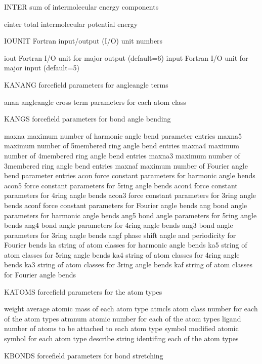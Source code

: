 \documentclass[letterpaper,11pt,english]{sphinxmanual}
\begin{document}
INTER   sum of intermolecular energy components

einter  total intermolecular potential energy

IOUNIT  Fortran input/output (I/O) unit numbers

iout    Fortran I/O unit for major output (default=6)
input   Fortran I/O unit for major input (default=5)

KANANG  forcefield parameters for angle\sphinxhyphen{}angle terms

anan    angle\sphinxhyphen{}angle cross term parameters for each atom class

KANGS   forcefield parameters for bond angle bending

maxna   maximum number of harmonic angle bend parameter entries
maxna5  maximum number of 5\sphinxhyphen{}membered ring angle bend entries
maxna4  maximum number of 4\sphinxhyphen{}membered ring angle bend entries
maxna3  maximum number of 3\sphinxhyphen{}membered ring angle bend entries
maxnaf  maximum number of Fourier angle bend parameter entries
acon    force constant parameters for harmonic angle bends
acon5   force constant parameters for 5\sphinxhyphen{}ring angle bends
acon4   force constant parameters for 4\sphinxhyphen{}ring angle bends
acon3   force constant parameters for 3\sphinxhyphen{}ring angle bends
aconf   force constant parameters for Fourier angle bends
ang     bond angle parameters for harmonic angle bends
ang5    bond angle parameters for 5\sphinxhyphen{}ring angle bends
ang4    bond angle parameters for 4\sphinxhyphen{}ring angle bends
ang3    bond angle parameters for 3\sphinxhyphen{}ring angle bends
angf    phase shift angle and periodicity for Fourier bends
ka      string of atom classes for harmonic angle bends
ka5     string of atom classes for 5\sphinxhyphen{}ring angle bends
ka4     string of atom classes for 4\sphinxhyphen{}ring angle bends
ka3     string of atom classes for 3\sphinxhyphen{}ring angle bends
kaf     string of atom classes for Fourier angle bends

KATOMS  forcefield parameters for the atom types

weight  average atomic mass of each atom type
atmcls  atom class number for each of the atom types
atmnum  atomic number for each of the atom types
ligand  number of atoms to be attached to each atom type
symbol  modified atomic symbol for each atom type
describe        string identifing each of the atom types

KBONDS  forcefield parameters for bond stretching
\end{document}
